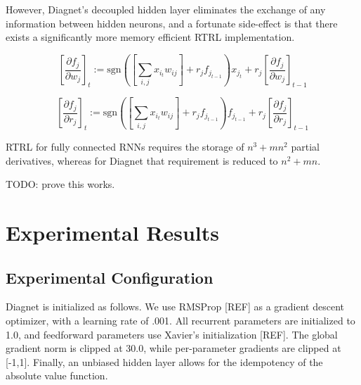 \documentclass{article}
\begin{document}
However, Diagnet's decoupled hidden layer eliminates the exchange of any information between hidden neurons, and a fortunate side-effect is that there exists a significantly more memory efficient RTRL implementation.

\begin{equation}
{\left[ {\frac{\partial f_j}{\partial w_j}} \right]}_t := \textrm{sgn}\left( \left[ \sum_{i, j} x_{i_t} w_{ij }\right] + r_j f_{j_{t-1}} \right) x_{j_t} + r_j {\left[ {\frac{\partial f_j}{\partial w_j}} \right]}_{t-1}
\end{equation}

\begin{equation}
{\left[ {\frac{\partial f_j}{\partial r_j}} \right]}_t := \textrm{sgn}\left( \left[ \sum_{i, j} x_{i_t} w_{ij }\right] + r_j f_{j_{t-1}} \right) f_{j_{t-1}} + r_j {\left[ {\frac{\partial f_j}{\partial r_j}} \right]}_{t-1}
\end{equation}

RTRL for fully connected RNNs requires the storage of $n^3 + mn^2$ partial derivatives, whereas for Diagnet that requirement is reduced to $n^2 + mn$.

TODO: prove this works.


\section{Experimental Results}
\label{others}
\subsection{Experimental Configuration} Diagnet is initialized as follows.  We use RMSProp [REF] as a gradient descent optimizer, with a learning rate of .001.  All recurrent parameters are initialized to 1.0, and feedforward parameters use Xavier's initialization [REF]. The global gradient norm is clipped at 30.0, while per-parameter gradients are clipped at [-1,1].  Finally, an unbiased hidden layer allows for the idempotency of the absolute value function. 
\end{document}
